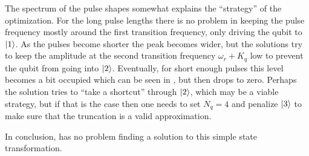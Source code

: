 \documentclass[main.tex]{subfiles}
\begin{document}
The spectrum of the pulse shapes somewhat explains the ``strategy'' of the optimization.
For the long pulse lengths there is no problem in keeping the pulse frequency mostly around the first transition frequency, only driving the qubit to \(\ket{1}\).
As the pulses become shorter the peak becomes wider, but the solutions try to keep the amplitude at the second transition frequency \(\omega_r+K_q\) low to prevent the qubit from going into \(\ket{2}\).
Eventually, for short enough pulses this level becomes a bit occupied which can be seen in , but then drops to zero.
Perhaps the solution tries to ``take a shortcut'' through \(\ket{2}\), which may be a viable strategy, but if that is the case then one needs to set \(N_q = 4\) and penalize \(\ket{3}\) to make sure that the truncation is a valid approximation.

In conclusion, \krotov{} has no problem finding a solution to this simple state transformation.
\end{document}
